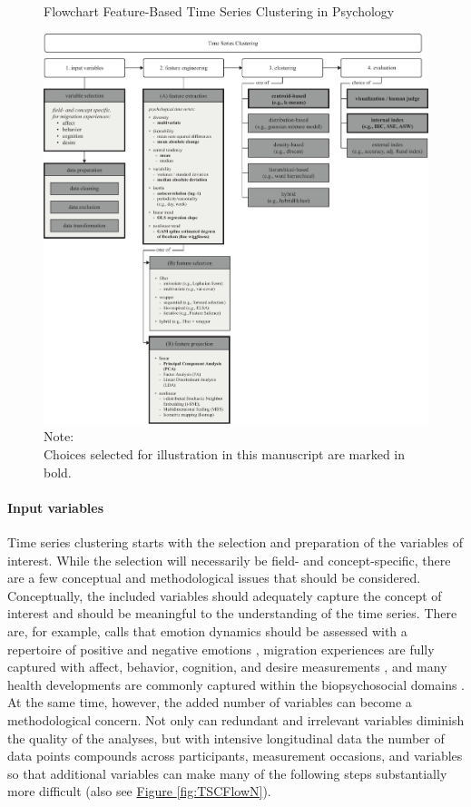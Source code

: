 \documentclass[man, 12pt, a4paper, mask, floatsintext]{apa7}
\theoremstyle{break}
\theoremstyle{plain}
\newcommand{\fgrref}[2][]{\hyperref[#2]{Figure \ref*{#2}#1}}
\begin{document}
\begin{figure}[!ht] %
  \caption{Flowchart Feature-Based Time Series Clustering in Psychology}
  \label{fig:TSCFlow}
  \centering\includegraphics[width=\textwidth]{figures/TS Cluster Flow/TimeSeriesClusterFlowSelection.pdf}
  \caption*{Note: \\
  Choices selected for illustration in this manuscript are marked in bold.}
\end{figure}

\paragraph{Input variables}
Time series clustering starts with the selection and preparation of the variables of interest. While the selection will necessarily be field- and concept-specific, there are a few conceptual and methodological issues that should be considered. Conceptually, the included variables should adequately capture the concept of interest and should be meaningful to the understanding of the time series. There are, for example, calls that emotion dynamics should be assessed with a repertoire of positive and negative emotions \citep[e.g.,][]{dejonckheere2019}, migration experiences are fully captured with affect, behavior, cognition, and desire measurements \citep[e.g.,][]{Kreienkamp2022d}, and many health developments are commonly captured within the biopsychosocial domains \citep[e.g.,][]{suls2004}. At the same time, however, the added number of variables can become a methodological concern. Not only can redundant and irrelevant variables diminish the quality of the analyses, but with intensive longitudinal data the number of data points compounds across participants, measurement occasions, and variables so that additional variables can make many of the following steps substantially more difficult (also see \fgrref{fig:TSCFlowN}). 
\end{document}
